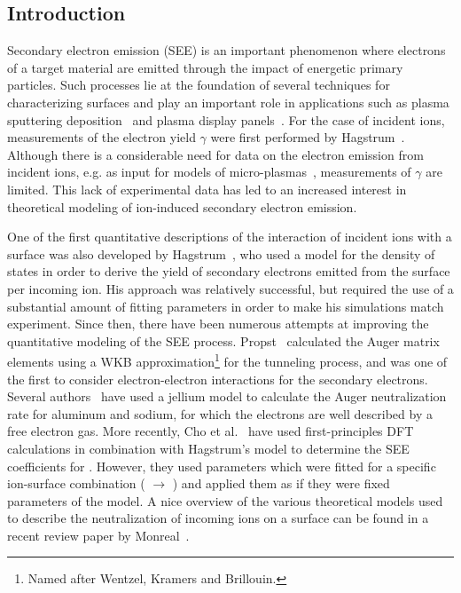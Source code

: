 \begin{refsection}
\newpage 
 
\section{Introduction} \label{quotas:sec-intro} 

Secondary electron emission (\gls{SEE}) is an important phenomenon where electrons 
of a target material are emitted through the impact of energetic primary 
particles. Such processes lie at the foundation of several techniques for 
characterizing surfaces and play an important role in applications such as 
plasma sputtering deposition~\cite{Depla2006, Depla2009} and plasma display 
panels~\cite{Motoyama2006, Cho2007}. For the case of incident ions, 
measurements of the electron yield $\gamma$ were first performed by 
Hagstrum~\cite{Hagstrum1953,Hagstrum1960}. Although there is a considerable 
need for data on the electron emission from incident ions, e.g. as input for 
models of micro-plasmas~\cite{Kothnur2003, Kothnur2005}, measurements of 
$\gamma$ are limited. This lack of experimental data has led to an increased 
interest in theoretical modeling of ion-induced secondary electron emission. 
 
One of the first quantitative descriptions of the interaction of incident ions 
with a surface was also developed by Hagstrum~\cite{Hagstrum1954, 
Hagstrum1961}, who used a model for the density of states in order to derive 
the yield of secondary electrons emitted from the surface per incoming ion. 
His approach was relatively successful, but required the use of a substantial 
amount of fitting parameters in order to make his simulations match 
experiment. Since then, there have been numerous attempts at improving the 
quantitative modeling of the \gls{SEE} process. Propst~\cite{Propst1963} calculated 
the Auger matrix elements using a WKB approximation\footnote{Named after Wentzel, Kramers and Brillouin.} for the tunneling process, 
and was one of the first to consider electron-electron interactions for the 
secondary electrons. Several authors~\cite{Almulhem1989, Lorente1994, 
Monreal1995} have used a jellium model to calculate the Auger neutralization 
rate for aluminum and sodium, for which the electrons are well described by a 
free electron gas. More recently, Cho et al.~\cite{Cho2007} have used 
first-principles \gls{DFT} calculations in combination 
with Hagstrum's model to determine the \gls{SEE} coefficients for . However, 
they used parameters which were fitted for a specific ion-surface combination 
( $\rightarrow$ ) and applied them as if they were fixed 
parameters of the model. A nice overview of the various theoretical models 
used to describe the neutralization of incoming ions on a surface can be found 
in a recent review paper by Monreal~\cite{Monreal2014}.
 

\end{refsection}

